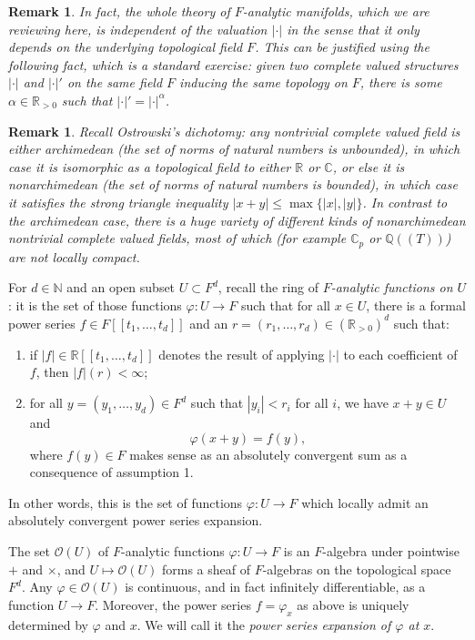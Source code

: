 \documentclass[12pt]{article}
\newtheorem{remark}[theorem]{Remark}
\begin{document}
\begin{remark} In fact, the whole theory of $F$-analytic manifolds, which we are reviewing here, is independent of the valuation $|\cdot|$ in the sense that it only depends on the underlying topological field $F$.  This can be justified using the following fact, which is a standard exercise: given two complete valued structures $|\cdot|$ and $|\cdot |'$ on the same field $F$ inducing the same topology on $F$, there is some $\alpha\in\mathbb{R}_{>0}$ such that $|\cdot|' = |\cdot|^\alpha$.
\end{remark}

\begin{remark}
Recall Ostrowski's dichotomy: any nontrivial complete valued field is either \emph{archimedean} (the set of norms of natural numbers is unbounded), in which case it is isomorphic as a topological field to either $\mathbb{R}$ or $\mathbb{C}$, or else it is \emph{nonarchimedean} (the set of norms of natural numbers is bounded), in which case it satisfies the strong triangle inequality $|x+y|\leq \operatorname{max}\{|x|,|y|\}$.  In contrast to the archimedean case, there is a huge variety of different kinds of nonarchimedean nontrivial complete valued fields, most of which (for example $\mathbb{C}_p$ or $\mathbb{Q}((T))$) are not locally compact.
\end{remark}

For $d\in\mathbb{N}$ and an open subset $U\subset F^d$, recall the ring of \emph{$F$-analytic functions on $U$}: it is the set of those functions $\varphi:U\rightarrow F$ such that for all $x\in U$, there is a formal power series $f \in F[[t_1,\ldots,t_d]]$ and an $r=(r_1,\ldots,r_d) \in (\mathbb{R}_{>0})^d$ such that:
\begin{enumerate}
\item if $|f|\in \mathbb{R}[[t_1,\ldots,t_d]]$ denotes the result of applying $|\cdot|$ to each coefficient of $f$, then $|f|(r)<\infty$;
\item for all $y=(y_1,\ldots,y_d)\in F^d$ such that $|y_i|<r_i$ for all $i$, we have $x+y\in U$ and
$$\varphi(x+y) = f(y),$$
where $f(y)\in F$ makes sense as an absolutely convergent sum as a consequence of assumption 1.
\end{enumerate}
In other words, this is the set of functions $\varphi:U\rightarrow F$ which locally admit an absolutely convergent power series expansion.  

The set $\mathcal{O}(U)$ of $F$-analytic functions $\varphi:U\rightarrow F$ is an $F$-algebra under pointwise $+$ and $\times$, and $U\mapsto \mathcal{O}(U)$ forms a sheaf of $F$-algebras on the topological space $F^d$.  Any $\varphi\in\mathcal{O}(U)$ is continuous, and in fact infinitely differentiable, as a function $U\rightarrow F$.  Moreover, the power series $f=\varphi_x$ as above is uniquely determined by $\varphi$ and $x$.  We will call it the \emph{power series expansion of $\varphi$ at $x$}.
\end{document}
